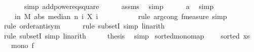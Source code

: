 \begin{isabellebody}
\ \ \ \ \ \isamarkupfalse%
\ {\isacharparenleft}{\kern0pt}simp\ add{\isacharcolon}{\kern0pt}power{}{\isacharunderscore}{\kern0pt}eq{\isacharunderscore}{\kern0pt}square{\isacharparenright}{\kern0pt}\isanewline
\ \ \ \ \isamarkupfalse%
\ assms{\isacharparenleft}{\kern0pt}{}{\isacharparenright}{\kern0pt}\ \isamarkupfalse%
\ simp\isanewline
\ \ \ \ \isamarkupfalse%
\ a\ \isamarkupfalse%
\ simp\isanewline
\ \ \isamarkupfalse%
\ \isamarkupfalse%
\ {\isachardoublequoteopen}{\isachardot}{\kern0pt}{\isachardot}{\kern0pt}{\isachardot}{\kern0pt}\ {\isacharequal}{\kern0pt}\ {\isasymP}{\isacharparenleft}{\kern0pt}{\isasymomega}\ in\ M{\isachardot}{\kern0pt}\ abs\ {\isacharparenleft}{\kern0pt}median\ n\ {\isacharparenleft}{\kern0pt}{\isasymlambda}i{\isachardot}{\kern0pt}\ X\ i\ {\isasymomega}{\isacharparenright}{\kern0pt}\ {\isacharminus}{\kern0pt}\ {\isasymmu}{\isacharparenright}{\kern0pt}\ {\isasymle}\ {\isasymdelta}{\isacharparenright}{\kern0pt}{\isachardoublequoteclose}\isanewline
\ \ \ \ \isamarkupfalse%
\ {\isacharparenleft}{\kern0pt}rule\ arg{\isacharunderscore}{\kern0pt}cong{}{\isacharbrackleft}{\kern0pt}\ f{\isacharequal}{\kern0pt}{\isachardoublequoteopen}measure{\isachardoublequoteclose}{\isacharbrackright}{\kern0pt}{\isacharcomma}{\kern0pt}\ simp{\isacharparenright}{\kern0pt}\isanewline
\ \ \ \ \isamarkupfalse%
\ {\isacharparenleft}{\kern0pt}rule\ order{\isacharunderscore}{\kern0pt}antisym{\isacharparenright}{\kern0pt}\isanewline
\ \ \ \ \isamarkupfalse%
\ {\isacharparenleft}{\kern0pt}rule\ subsetI{\isacharcomma}{\kern0pt}\ simp{\isacharcomma}{\kern0pt}\ linarith{\isacharparenright}{\kern0pt}\isanewline
\ \ \ \ \isamarkupfalse%
\ {\isacharparenleft}{\kern0pt}rule\ subsetI{\isacharcomma}{\kern0pt}\ simp{\isacharcomma}{\kern0pt}\ linarith{\isacharparenright}{\kern0pt}\isanewline
\ \ \isamarkupfalse%
\ \isamarkupfalse%
\ {\isacharquery}{\kern0pt}thesis\ \isamarkupfalse%
\ simp\isanewline
{}\isamarkupfalse%
%
\endisatagproof
{\isafoldproof}%
%
\isadelimproof
\isanewline
%
\endisadelimproof
\isanewline
{}\isamarkupfalse%
\ sorted{\isacharunderscore}{\kern0pt}mono{\isacharunderscore}{\kern0pt}map{\isacharcolon}{\kern0pt}\ \isanewline
\ \ \ {\isachardoublequoteopen}sorted\ xs{\isachardoublequoteclose}\isanewline
\ \ \ {\isachardoublequoteopen}mono\ f{\isachardoublequoteclose}\isanewline

\end{isabellebody}

